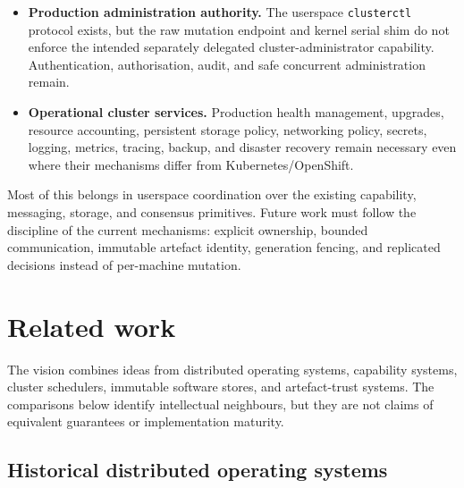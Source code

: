 \begin{itemize}
    \item \textbf{Production administration authority.} The userspace
        \texttt{clusterctl} protocol exists, but the raw mutation endpoint
        and kernel serial shim do not enforce the intended separately
        delegated cluster-administrator capability. Authentication,
        authorisation, audit, and safe concurrent administration remain.

    \item \textbf{Operational cluster services.} Production health
        management, upgrades, resource accounting, persistent storage
        policy, networking policy, secrets, logging, metrics, tracing,
        backup, and disaster recovery remain necessary even where their
        mechanisms differ from Kubernetes/OpenShift.
\end{itemize}

Most of this belongs in userspace coordination over the existing capability,
messaging, storage, and consensus primitives. Future work must follow the
discipline of the current mechanisms: explicit ownership, bounded
communication, immutable artefact identity, generation fencing, and
replicated decisions instead of per-machine mutation.

\section{Related work}

The vision combines ideas from distributed operating systems, capability
systems, cluster schedulers, immutable software stores, and artefact-trust
systems. The comparisons below identify intellectual neighbours, but they are
not claims of equivalent guarantees or implementation maturity.

\subsection{Historical distributed operating systems}

